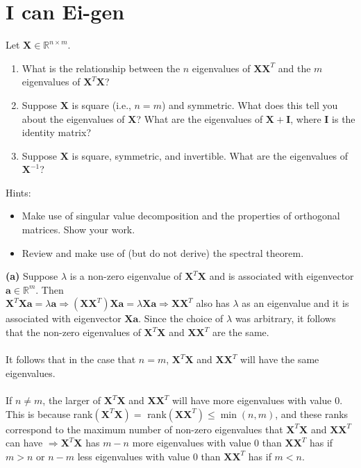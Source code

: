 \documentclass[submit]{harvardml}
\newcommand{\R}{\mathbb{R}}
\renewcommand{\v}[1]{\mathbf{#1}}
\begin{document}
\newpage
\section*{I can Ei-gen}
\begin{problem}
    Let $\v X \in \R^{n \times m}$.
    \begin{enumerate}[label=(\alph*)]
        \item What is the relationship between the $n$ eigenvalues
              of $\v X \v X^T$ and the $m$ eigenvalues of $\v X^T \v X$?
        \item Suppose $\v X$ is square (i.e., $n=m$) and symmetric.
              What does this tell you about the eigenvalues of $\v X$?
              What are the eigenvalues of $\v X + \v I$, where $\v I$ is the identity matrix?
        \item Suppose $\v X$ is square, symmetric, and invertible.
			  What are the eigenvalues of $\v X^{-1}$?
	\end{enumerate}
	Hints:
	\begin{itemize}
		\item Make use of singular value decomposition and the properties
			  of orthogonal matrices. Show your work.
		\item Review and make use of (but do not derive) the spectral theorem.
	\end{itemize}
\end{problem}




\textbf{(a)} Suppose $\lambda$ is a non-zero eigenvalue of $\mathbf{X}^{T}\mathbf{X}$ and is associated with eigenvector $\mathbf{a} \in \R^{m}$. Then \\$\mathbf{X}^{T}\mathbf{X}\mathbf{a}=\lambda \mathbf{a} \Rightarrow (\mathbf{XX}^{T})\mathbf{Xa}=\lambda \mathbf{Xa} \Rightarrow \mathbf{XX}^{T}$ also has $\lambda$ as an eigenvalue and it is associated with eigenvector $\mathbf{Xa}$. Since the choice of $\lambda$ was arbitrary, it follows that the non-zero eigenvalues of $\mathbf{X}^{T}\mathbf{X}$ and $\mathbf{XX}^{T}$ are the same.\\\\
It follows that in the case that $n=m$, $\mathbf{X}^{T}\mathbf{X}$ and $\mathbf{XX}^{T}$ will have the same eigenvalues.\\\\
If $n\neq m$, the larger of $\mathbf{X}^{T}\mathbf{X}$ and $\mathbf{XX}^{T}$ will have more eigenvalues with value $0$. This is because rank$(\mathbf{X}^{T}\mathbf{X})=$ rank$(\mathbf{XX}^{T}) \leq \min(n, m)$, and these ranks correspond to the maximum number of non-zero eigenvalues that $\mathbf{X}^{T}\mathbf{X}$ and $\mathbf{XX}^{T}$ can have $\Rightarrow \mathbf{X}^{T}\mathbf{X}$ has $m-n$ more eigenvalues with value 0 than $\mathbf{XX}^{T}$ has if $m>n$ or $n-m$ less eigenvalues with value 0 than $\mathbf{XX}^{T}$ has if $m<n$.\\\\\\
\end{document}
